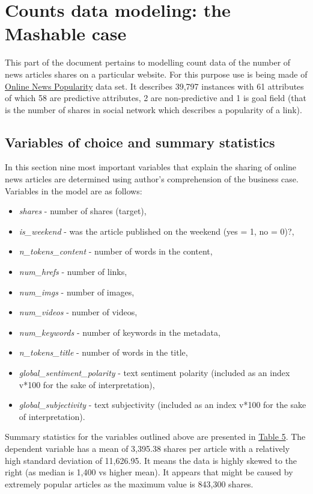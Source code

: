 \documentclass{article}
\begin{document}
\section{Counts data modeling: the Mashable case}

This part of the document pertains to modelling count data of the number of news articles shares on a particular website. For this purpose use is being made of \hyperlink{https://archive.ics.uci.edu/ml/datasets/Online+News+Popularity}{Online News Popularity} data set. It describes 39,797 instances with 61 attributes of which 58 are predictive attributes, 2 are non-predictive and 1 is goal field (that is the number of shares in social network which describes a popularity of a link).

\subsection{Variables of choice and summary statistics}

In this section nine most important variables that explain the sharing of online news articles are determined using author's comprehension of the business case. Variables in the model are as follows:

\begin{itemize}
    \item \textit{shares} - number of shares (target),
    \item \textit{is\_weekend} - was the article published on the weekend (yes = 1, no = 0)?,
    \item \textit{n\_tokens\_content} - number of words in the content,
    \item \textit{num\_hrefs} - number of links,
    \item \textit{num\_imgs} - number of images,
    \item \textit{num\_videos} - number of videos,
    \item \textit{num\_keywords} - number of keywords in the metadata,
    \item \textit{n\_tokens\_title} - number of words in the title,
    \item \textit{global\_sentiment\_polarity} - text sentiment polarity (included as an index v*100 for the sake of interpretation),
    \item \textit{global\_subjectivity} - text subjectivity (included as an index v*100 for the sake of interpretation).
\end{itemize}

Summary statistics for the variables outlined above are presented in \hyperref[tab:summaryshares]{Table 5}. The dependent variable has a mean of 3,395.38 shares per article with a relatively high standard deviation of 11,626.95. It means the data is highly skewed to the right (as median is 1,400 vs higher mean). It appears that might be caused by extremely popular articles as the maximum value is 843,300 shares. 
\end{document}
